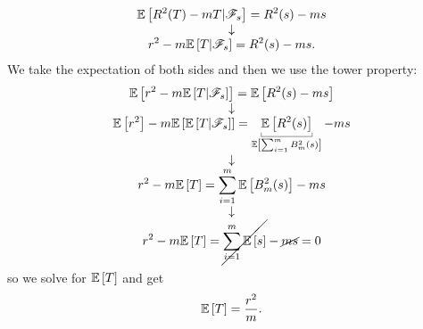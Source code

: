 \documentclass[12pt]{article}
\begin{document}
\begin{enumerate}
\begin{equation*}
			\begin{array}{>{\displaystyle}c}
				\ev\left[R^2(T)-mT|\F_{s}\right]=R^{2}(s)-ms\\
				\downarrow\\
				r^{2}-m\ev\left[T|\F_{s}\right]=R^{2}(s)-ms.
			\end{array}
		\end{equation*}
		We take the expectation of both sides and then we use the tower property:
		\begin{equation*}
			\begin{array}{>{\displaystyle}c}
				\ev\left[r^{2}-m\ev\left[T|\F_{s}\right]\right]=\ev\left[R^{2}(s)-ms\right]\\
				\downarrow\\
				\ev\left[r^{2}\right]-m\ev\left[\ev\left[T|\F_{s}\right]\right]=\ubracketthin{\ev\left[{R^{2}(s)}\right]}_{\ev\left[\sum_{i=1}^{m}B_{m}^{2}(s)\right]}-ms\\
				\downarrow\\
				r^{2}-m\ev\left[T\right]=\sum_{i=1}^{m}\ev\left[B_{m}^{2}(s)\right]-ms\\
				\downarrow\\
				r^{2}-m\ev\left[T\right]=\cancel{\sum_{i=1}^{m}\ev\left[s\right]}-\cancel{ms}=0
			\end{array}
		\end{equation*}
		so we solve for $\mathbb{E}\left[T\right]$ and get
		\begin{equation*}
			\mathbb{E}\left[T\right]=\frac{r^{2}}{m}.
		\end{equation*}
	\end{enumerate}
\end{document}
